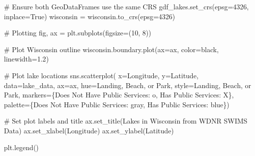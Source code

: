 \documentclass[
]{article}
\newenvironment{Shaded}{\begin{snugshade}}{\end{snugshade}}
\newcommand{\CommentTok}[1]{\textcolor[rgb]{0.37,0.37,0.37}{#1}}
\newcommand{\DecValTok}[1]{\textcolor[rgb]{0.68,0.00,0.00}{#1}}
\newcommand{\FloatTok}[1]{\textcolor[rgb]{0.68,0.00,0.00}{#1}}
\newcommand{\NormalTok}[1]{\textcolor[rgb]{0.00,0.23,0.31}{#1}}
\newcommand{\OperatorTok}[1]{\textcolor[rgb]{0.37,0.37,0.37}{#1}}
\newcommand{\StringTok}[1]{\textcolor[rgb]{0.13,0.47,0.30}{#1}}
\newcommand{\VariableTok}[1]{\textcolor[rgb]{0.07,0.07,0.07}{#1}}
\begin{document}
\begin{Shaded}
\begin{Highlighting}[]
\CommentTok{\# Ensure both GeoDataFrames use the same CRS}
\NormalTok{gdf\_lakes.set\_crs(epsg}\OperatorTok{=}\DecValTok{4326}\NormalTok{, inplace}\OperatorTok{=}\VariableTok{True}\NormalTok{)}
\NormalTok{wisconsin }\OperatorTok{=}\NormalTok{ wisconsin.to\_crs(epsg}\OperatorTok{=}\DecValTok{4326}\NormalTok{)}

\CommentTok{\# Plotting}
\NormalTok{fig, ax }\OperatorTok{=}\NormalTok{ plt.subplots(figsize}\OperatorTok{=}\NormalTok{(}\DecValTok{10}\NormalTok{, }\DecValTok{8}\NormalTok{))}

\CommentTok{\# Plot Wisconsin outline}
\NormalTok{wisconsin.boundary.plot(ax}\OperatorTok{=}\NormalTok{ax, color}\OperatorTok{=}\StringTok{\textquotesingle{}black\textquotesingle{}}\NormalTok{, linewidth}\OperatorTok{=}\FloatTok{1.2}\NormalTok{)}

\CommentTok{\# Plot lake locations}
\NormalTok{sns.scatterplot(}
\NormalTok{    x}\OperatorTok{=}\StringTok{\textquotesingle{}Longitude\textquotesingle{}}\NormalTok{, y}\OperatorTok{=}\StringTok{\textquotesingle{}Latitude\textquotesingle{}}\NormalTok{, data}\OperatorTok{=}\NormalTok{lake\_data, ax}\OperatorTok{=}\NormalTok{ax,}
\NormalTok{    hue}\OperatorTok{=}\StringTok{\textquotesingle{}Landing, Beach, or Park\textquotesingle{}}\NormalTok{, style}\OperatorTok{=}\StringTok{\textquotesingle{}Landing, Beach, or Park\textquotesingle{}}\NormalTok{,}
\NormalTok{    markers}\OperatorTok{=}\NormalTok{\{}\StringTok{\textquotesingle{}Does Not Have Public Services\textquotesingle{}}\NormalTok{: }\StringTok{\textquotesingle{}o\textquotesingle{}}\NormalTok{, }\StringTok{\textquotesingle{}Has Public Services\textquotesingle{}}\NormalTok{: }\StringTok{\textquotesingle{}X\textquotesingle{}}\NormalTok{\},}
\NormalTok{    palette}\OperatorTok{=}\NormalTok{\{}\StringTok{\textquotesingle{}Does Not Have Public Services\textquotesingle{}}\NormalTok{: }\StringTok{\textquotesingle{}gray\textquotesingle{}}\NormalTok{, }\StringTok{\textquotesingle{}Has Public Services\textquotesingle{}}\NormalTok{: }\StringTok{\textquotesingle{}blue\textquotesingle{}}\NormalTok{\})}

\CommentTok{\# Set plot labels and title}
\NormalTok{ax.set\_title(}\StringTok{\textquotesingle{}Lakes in Wisconsin from WDNR SWIMS Data\textquotesingle{}}\NormalTok{)}
\NormalTok{ax.set\_xlabel(}\StringTok{\textquotesingle{}Longitude\textquotesingle{}}\NormalTok{)}
\NormalTok{ax.set\_ylabel(}\StringTok{\textquotesingle{}Latitude\textquotesingle{}}\NormalTok{)}

\NormalTok{plt.legend()}
\end{Highlighting}
\end{Shaded}
\end{document}
